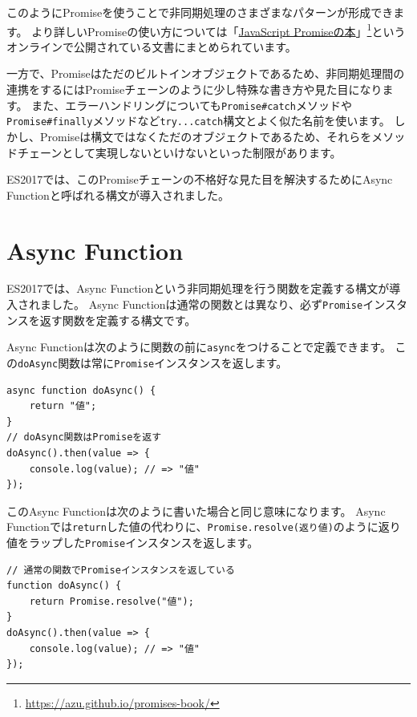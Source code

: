 このようにPromiseを使うことで非同期処理のさまざまなパターンが形成できます。
より詳しいPromiseの使い方については「\href{https://azu.github.io/promises-book/}{JavaScript
Promiseの本}」\footnote{\url{https://azu.github.io/promises-book/}}というオンラインで公開されている文書にまとめられています。

一方で、Promiseはただのビルトインオブジェクトであるため、非同期処理間の連携をするにはPromiseチェーンのように少し特殊な書き方や見た目になります。
また、エラーハンドリングについても\texttt{Promise\#catch}メソッドや\texttt{Promise\#finally}メソッドなど\texttt{try...catch}構文とよく似た名前を使います。
しかし、Promiseは構文ではなくただのオブジェクトであるため、それらをメソッドチェーンとして実現しないといけないといった制限があります。

ES2017では、このPromiseチェーンの不格好な見た目を解決するためにAsync
Functionと呼ばれる構文が導入されました。

\hypertarget{async-function}{%
\section[Async Function]{Async Function\,\protect{}}\label{async-function}}

ES2017では、Async
Functionという非同期処理を行う関数を定義する構文が導入されました。 Async
Functionは通常の関数とは異なり、必ず\texttt{Promise}インスタンスを返す関数を定義する構文です。

Async
Functionは次のように関数の前に\texttt{async}をつけることで定義できます。
この\texttt{doAsync}関数は常に\texttt{Promise}インスタンスを返します。

\begin{lstlisting}
async function doAsync() {
    return "値";
}
// doAsync関数はPromiseを返す
doAsync().then(value => {
    console.log(value); // => "値"
});
\end{lstlisting}

このAsync Functionは次のように書いた場合と同じ意味になります。 Async
Functionでは\texttt{return}した値の代わりに、\texttt{Promise.resolve(返り値)}のように返り値をラップした\texttt{Promise}インスタンスを返します。

\begin{lstlisting}
// 通常の関数でPromiseインスタンスを返している
function doAsync() {
    return Promise.resolve("値");
}
doAsync().then(value => {
    console.log(value); // => "値"
});
\end{lstlisting}

